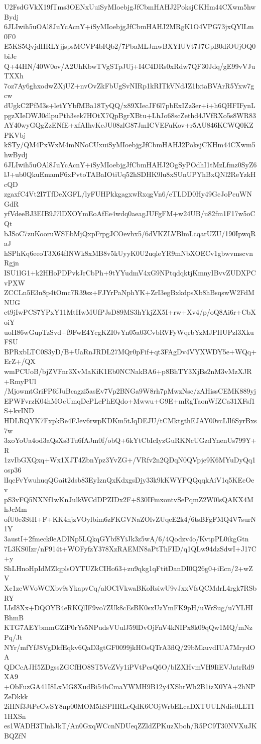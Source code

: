 U2FsdGVkX19fTms3OENxUuiSyMIoebjgJfCbmHAHJ2PoksjCKHm44CXwm5hwBydj
6JLIwih5uOAl8JuYcAcnY+iSyMIoebjgJfCbmHAHJ2MRgK1O4VPG73jxQYlLm0F0
E5KS5QvjdHRLYjjspsMCVP4bIQb2/7PbaMLJmwBXYIUVt7J7GpB0diOUjOQ0biJe
Q+44HN/40W0ov/A2UhKbwTVgSTpJUj+I4C4DRs0xRdw7QF30Jdq/gE99vVJuTXXh
7oz7Ay6ghxodwZXjUZ+nvOvZkFbUgSvNIRp1kRITkVNdJZ1lxtaBVArR5Yxw7gcw
dUgkC2PfM3s+letYYbfMBa18TyQQ/x89XIecJF6l7pbExIZz3er+i+h6QHFIFynL
pgzXIeDWJ0dlpuPth3sek7HOtX7QpBgrXBtu+LhJo68scZethd4JVfRXo5s8WR83
AY40wyGQgZzENfE+xfAIhvKeJU08zlG87JmICVEFuKov+r5AU846KCWQ0KZPKVbj
kSTy/QM4PxWxM4mNNoCUxuiSyMIoebjgJfCbmHAHJ2PoksjCKHm44CXwm5hwBydj
6JLIwih5uOAl8JuYcAcnY+iSyMIoebjgJfCbmHAHJ2OgSyPOdhI1tMzLfmz0SyZ6
lJ+ub0QkuEmamF6xPvtoTABaIOtiUq52hSDHK9lu8xSUnUPYhBxQNl2ReYzkHcQD
zgaxfC4Vt2I7TfDeXGFL/lyFUHPkkgagxwRxqgVn6/eTLDD0Hy49GcJoPcuWNGdR
yfVdeeBJ3EIB9J7lDXOYmEoAfEe4wdq0aeagJUFgFM+w24UB/u82fm1F17w5oCQt
bJSoC7zuKooruWSEbMjQxpFrpgJCOevhx5/6dVKZLVBlmLcqarUZU/190IpwqRaJ
hSPhKq6eeoT3X64fINWk8xMB8v5kUyyK0U2uqleYR9mNbXOECv1gbwvmscvnRgjn
ISU1lG1+k2HHoPDPvkJrCbPh+9tYYudmV4xG9NPtqdqktjKmnyIBvvZUDXPCvPXW
ZCCLn5E3n8p4tOmc7R39sz+FJYrPaNphYK+ZrI3egBxkdpsXb8hBsqswW2FdMNUG
ct9jIwPCS7YPxY11MtHwMUfPJsD89MS3hYkjZX5I+rw+Xv4/p/oQ8Ai6r+CbXoiY
uoH86wGupTzSvd+f9FwE4YcgKZI0vYn05a03CvbRVFyWqrbYzMJPHUPzl3XkuFSU
BPRxbLTC0S3yD/B+UaRnJRDL27MQr0pFif+qt3FAgDv4VYXWDY5e+WQq+ErZ+/QX
wmPCUoB/bjZVFnr3XvMaKiK1Eb0NCNakBA6+p8BhTY3XjBs2nM3vMzXJR+RmyPUl
/MjowmtGriFP6fJuBcagzi5asEv7Vp2BNGa9W8rh7pMwzNsc/zAHissCEMK889yj
EPWFvrzK04hMOcUmqDcPLePhEQdo+Mwwu+G9E+mRgTaonWfZCa31XFsf1S+kvIND
HDLRQYK7FxpkBe4FJev6rwpKDKm5tJqDEJU/tCMktgthEJAY00vcLIl6SyrBxs7w
3xoYoUa4od3aQsXs3Tu6fAJm0f/obQ+6kYtCbIcIyzGuRKNcUGzdYnenUs799Y+R
1zvIbGXQxq+Wx1XJT4ZbnYpz3YvZG+/VRfv2n2QDqN0QVpje9K6MYuDyQq1osp36
lIqcFvYwuhuqQGait2dsb83EyIznQxKdxgsDjy33k9kKWYPQQqqkAiV1q5KEcOev
pS3vFQ5NXNf1wKnJulkWCdDPZIDx2F+S30IFmxontvSePqmZ2W0lsQAKX4MhJcMm
ofU0e3StH+F+KK4njzVOylbim6zFKGVNaZOlvZUqeE2k4/6tsBFgFMQ4V7surN1Y
3austI+2fmeck0eADINp5LQkqGYbf8YiJk3z5wA/6/4Qodzv4o/KvtpPL0ikgGtn
7L3KS0Izr/nF914t+WOFyfzY378XzRAEMN8aPtThFID/q1QLw94dzSdwI+J17C+y
ShLHnoHpIdMZlqplsOYTUZkCIHo63+zu9qkg1qFtitDanDI0Q26g0+iEcn/2+wZV
Xc1zeWVoWCXbv9sYkapvCq/alOClVkwaBKoRsiwU9vJxxVfsQCMdrL4rgk7RSbRY
LIsI8Xx+DQOYB4eRKQlIF9vo7ZUk8cEsBK0sxUzYmFK9pH/uWrSug/u7YLHIBhmB
KTG7AEYbmmGZiP0rYs5NPudsVUulJ59lDvOjFnV4kNIPx8k09qQw1MQ/mNzPq/Jt
NYr/mfYfJ8VgDkfEqkv6QaD3gtGF0099jkHOsQTrA3flQ/29bMkuvdIUA7MrydOA
QDCcAJH5ZDgssZGCfHO8ST5VcZVy1iPVtPcsQ6O/blZXHvmVH9IiEVJntrRd9XA9
+ObFuzGA41I8LxMG8XudBi54bCmaYWMH9B12y4XShrWh2B1izX0YA+2hNPZeDkkk
2iHNf3JtPeCwSY8np00MOM5hSPHRLcQdK6COjWrbELcaDXTUULNdie0LLTI1HXSn
es1WADH3TlnhJkT/An0GxqWCcnNDUeqZZldZPKuzXboh/R5PC9T30NVXuJKBQZfN
